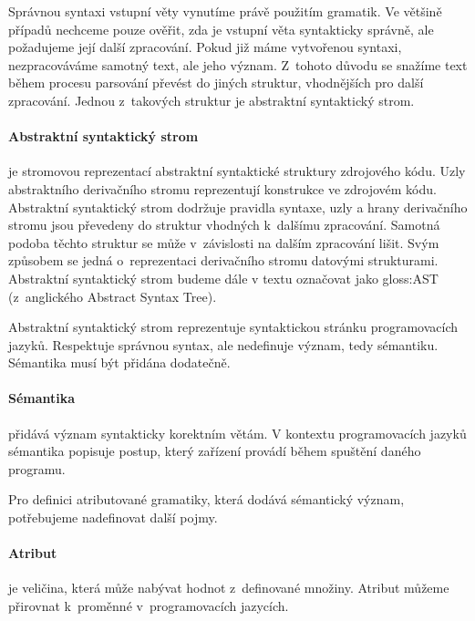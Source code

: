 		\vspace{1em}
		
		Správnou syntaxi vstupní věty vynutíme právě použitím gramatik. Ve většině případů nechceme pouze ověřit, zda je vstupní věta syntakticky správně, ale požadujeme její další zpracování. Pokud již máme vytvořenou syntaxi, nezpracováváme samotný text, ale jeho význam. Z~tohoto důvodu se snažíme text během procesu parsování převést do jiných struktur, vhodnějších pro další zpracování. Jednou z~takových struktur je abstraktní syntaktický strom.
		
		\paragraph{Abstraktní syntaktický strom}
		je stromovou reprezentací abstraktní syntaktické struktury zdrojového kódu. Uzly abstraktního derivačního stromu reprezentují konstrukce ve zdrojovém kódu. Abstraktní syntaktický strom dodržuje pravidla syntaxe, uzly a hrany derivačního stromu jsou převedeny do struktur vhodných k~dalšímu zpracování. Samotná podoba těchto struktur se může v~závislosti na dalším zpracování lišit. Svým způsobem se jedná o~reprezentaci derivačního stromu datovými strukturami. Abstraktní syntaktický strom budeme dále v textu označovat jako \gls{gloss:AST} (z~anglického Abstract Syntax Tree).
		
		\vspace{1em}
			
		Abstraktní syntaktický strom reprezentuje syntaktickou stránku programovacích jazyků. Respektuje správnou syntax, ale nedefinuje význam, tedy sémantiku. Sémantika musí být přidána dodatečně.
		
		\paragraph{Sémantika}
		přidává význam syntakticky korektním větám. V kontextu programovacích jazyků sémantika popisuje postup, který zařízení provádí během spuštění daného programu.
		
		\vspace{1em}
		
		Pro definici atributované gramatiky, která dodává sémantický význam, potřebujeme nadefinovat další pojmy.
		
		\paragraph{Atribut}
		je veličina, která může nabývat hodnot z~definované množiny. Atribut můžeme přirovnat k~proměnné v~programovacích jazycích.

